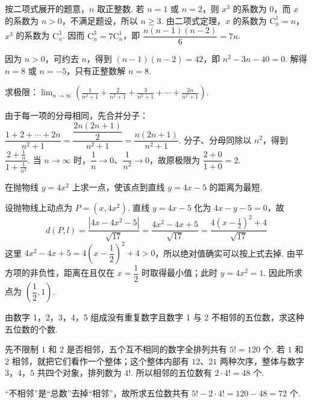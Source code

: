 \documentclass[UTF8,a4paper,oneside,11pt]{ctexbook}
\begin{document}
\begin{solution}
按二项式展开的题意，\(n\) 取正整数. 若 \(n=1\) 或 \(n=2\)，则 \(x^3\) 的系数为 \(0\)，而 \(x\) 的系数为 \(n>0\)，不满足题设，所以 \(n\geqslant3\). 由二项式定理，\(x\) 的系数为 \(\mathrm C_n^1=n\)，\(x^3\) 的系数为 \(\mathrm C_n^3\). 因而
\(\mathrm C_n^3=7\mathrm C_n^1\)，即 \(\dfrac{n(n-1)(n-2)}{6}=7n\).

因为 \(n>0\)，可约去 \(n\)，得到 \((n-1)(n-2)=42\)，即 \(n^2-3n-40=0\). 解得 \(n=8\) 或 \(n=-5\)，只有正整数解 \(n=8\).
\end{solution}

\begin{problem}

求极限：\(\displaystyle\lim_{n \to \infty}\left(\frac{1}{n^2 + 1} + \frac{2}{n^2 + 1} + \frac{3}{n^2 + 1} + \cdots + \frac{2n}{n^2 + 1}\right)\).
\end{problem}

\begin{solution}
由于每一项的分母相同，先合并分子：
\(\dfrac{1+2+\cdots+2n}{n^2+1}=\dfrac{\dfrac{2n(2n+1)}{2}}{n^2+1}=\dfrac{n(2n+1)}{n^2+1}\). 分子、分母同除以 \(n^2\)，得到
\(\dfrac{2+\frac1n}{1+\frac1{n^2}}\). 当 \(n\to\infty\) 时，\(\dfrac1n\to0\)、\(\dfrac1{n^2}\to0\)，故原极限为
\(\dfrac{2+0}{1+0}=2\).
\end{solution}

\begin{problem}

在抛物线 \(y = 4x^2\) 上求一点，使该点到直线 \(y = 4x - 5\) 的距离为最短.
\end{problem}

\begin{solution}
设抛物线上动点为 \(P=(x,4x^2)\). 直线 \(y=4x-5\) 化为 \(4x-y-5=0\)，故
\[
d(P,l)=\frac{|4x-4x^2-5|}{\sqrt{17}}
=\frac{4x^2-4x+5}{\sqrt{17}}
=\frac{4\left(x-\frac12\right)^2+4}{\sqrt{17}}
\]
这里 \(4x^2-4x+5=4\left(x-\dfrac12\right)^2+4>0\)，所以绝对值确实可以按上式去掉. 由平方项的非负性，距离在且仅在 \(x=\dfrac12\) 时取得最小值；此时 \(y=4x^2=1\). 因此所求点为 \(\left(\dfrac12,1\right)\).
\end{solution}

\begin{problem}

由数字 1，2，3，4，5 组成没有重复数字且数字 1 与 2 不相邻的五位数，求这种五位数的个数.
\end{problem}

\begin{solution}
先不限制 \(1\) 和 \(2\) 是否相邻，五个互不相同的数字全排列共有 \(5!=120\) 个. 若 \(1\) 和 \(2\) 相邻，就把它们看作一个整体；这个整体内部有 \(12\)、\(21\) 两种次序，整体与数字 \(3\)，\(4\)，\(5\) 共四个对象，排列数为 \(4!\). 所以相邻的五位数有 \(2\cdot4!=48\) 个.

“不相邻”是“总数”去掉“相邻”，故所求五位数共有 \(5!-2\cdot4!=120-48=72\) 个.
\end{solution}
\end{document}
